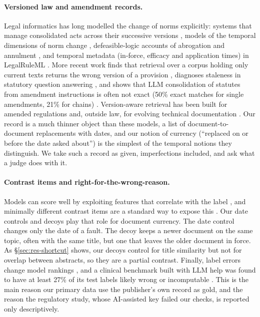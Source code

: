 \paragraph{Versioned law and amendment records.}
Legal informatics has long modelled the change of norms explicitly: systems that manage consolidated acts across their
successive versions \citep{palmirani2002norma}, models of the temporal dimensions of norm change
\citep{palmirani2006time}, defeasible-logic accounts of abrogation and
annulment \citep{governatori2010changing}, and temporal metadata (in-force, efficacy and
application times) in LegalRuleML \citep{palmirani2011legalruleml}.
More recent work finds that retrieval over a corpus holding only current texts returns the wrong version of a
provision \citep{cymbler2026temporal},
diagnoses staleness in statutory question answering \citep{prior2026oldfriend}, and shows that LLM consolidation of statutes from amendment
instructions is often not exact (50\% exact matches for single amendments, 21\% for chains)
\citep{prior2025consolidation}. Version-aware retrieval has been built for amended regulations
\citep{nam2026timelyrag} and, outside law, for evolving technical documentation \citep{huwiler2025versionrag}. Our record is a much thinner object than these models, a list of
document-to-document replacements with dates, and our notion of currency (``replaced on or before the date asked
about'') is the simplest of the temporal notions they distinguish. We take such a record as given, imperfections
included, and ask what a judge does with it.

\paragraph{Contrast items and right-for-the-wrong-reason.}
Models can score well by exploiting features that correlate with the label \citep{mccoy2019right}, and minimally
different contrast items are a standard way to expose this \citep{gardner2020contrast}. Our date controls and decoys
play that role for document currency. The date control changes only the date of a fault. The decoy keeps a newer
document on the same topic, often with the same title, but one that leaves the older document in force. As
\S\ref{sec:res-shortcut} shows, our decoys control for title similarity but not for overlap between abstracts, so they
are a partial contrast. Finally, label errors change model rankings \citep{northcutt2021pervasive,gema2025mmlu}, and
a clinical benchmark built with LLM help was found to have at least 27\% of its test labels likely wrong or
incomputable \citep{ye2025stewardship}. This is the main reason our
primary data use the publisher's own record as gold, and the reason the regulatory study, whose AI-assisted key failed
our checks, is reported only descriptively.
